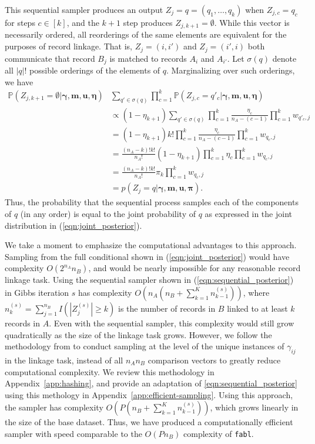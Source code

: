 \documentclass[12pt,letterpaper]{article}
\newcommand{\1}[1]{\mathbb{I}\!\left[#1\right]} %
\begin{document}
This sequential sampler produces an output $Z_j = q = (q_1, \ldots, q_k)$ when $Z_{j, c} = q_c$ for steps $c \in [k]$, and the $k+1$ step produces $Z_{j, k+1} = \emptyset$. While this vector is necessarily ordered, all reorderings of the same elements are equivalent for the purposes of record linkage.   That is, $Z_j = (i, i')$ and $Z_j = (i', i)$ both communicate that record $B_j$ is matched to records $A_i$ and $A_{i'}$. Let $\sigma(q)$ denote all $|q|!$ possible orderings of the elements of $q$. Marginalizing over such orderings, we have
\begin{align}
	\mathbb{P}(Z_{j, k+1} = \emptyset | \bm{\gamma}, \bm{m}, \bm{u}, \bm{\eta}) &\sum_{q' \in \sigma(q)} \prod_{c = 1}^{k} \mathbb{P}(Z_{j, c} = q'_c|\bm{\gamma}, \bm{m}, \bm{u}, \bm{\eta}) \\
	&\propto (1 - \eta_{k+1}) \sum_{q' \in \sigma(q)} \prod_{c = 1}^{k} \frac{\eta_{c} }{n_A - (c - 1)}  \prod_{c = 1}^{k} w_{q'_c, j} \\
	&=(1 - \eta_{k+1}) k! \prod_{c = 1}^{k} \frac{\eta_{c} }{n_A - (c - 1)}  \prod_{c = 1}^{k} w_{q_c, j} \\
	&= \frac{(n_A - k)!k!}{n_A!} (1 - \eta_{k+1})\prod_{c = 1}^{k} \eta_{c} \prod_{c = 1}^{k} w_{q_c, j} \\
	&= \frac{(n_A - k)!k!}{n_A!} \pi_k \prod_{c = 1}^{k} w_{q_c, j} \\
	&= p\left(Z_j  = q |\bm{\gamma}, \bm{m}, \bm{u}, \bm{\pi}\right).
\end{align}
Thus, the probability that the sequential process samples each of the components of $q$ (in any order) is equal to the joint probability of $q$ as expressed in the joint distribution in (\ref{eqn:joint_posterior}).

We take a moment to emphasize the computational advantages to this approach. Sampling from the full conditional shown in (\ref{eqn:joint_posterior}) would have complexity $O(2^{n_A}n_B)$, and would be nearly impossible for any reasonable record linkage task. Using the sequential sampler shown in (\ref{eqn:sequential_posterior}) in Gibbs iteration $s$ has complexity $O\left(n_A (n_B + \sum_{k=1}^K n_{k-1}^{(s)})\right)$, where $n_k^{(s)} = \sum_{j=1}^{n_B} I\left(|Z_j^{(s)}| \geq k\right)$ is the number of records in $B$ linked to at least $k$ records in $A$. Even with the sequential sampler, this complexity  would still grow quadratically as the size of the linkage task grows. However, we follow the methodology from \cite{kundinger_2023} to conduct sampling at the level of the unique instances of $\gamma_{ij}$ in the linkage task, instead of all $n_A n_B$ comparison vectors to greatly reduce computational complexity. We review this methodology in Appendix~\ref{app:hashing}, and provide an adaptation of \eqref{eqn:sequential_posterior} using this methology in Appendix~\ref{app:efficient-sampling}. Using this approach, the sampler has complexity $O\left(P (n_B + \sum_{k=1}^K n_{k-1}^{(s)})\right)$, which grows linearly in the size of the base dataset. Thus, we have produced a computationally efficient sampler with speed comparable to the $O(P n_B)$ complexity of \texttt{fabl}.
\end{document}
